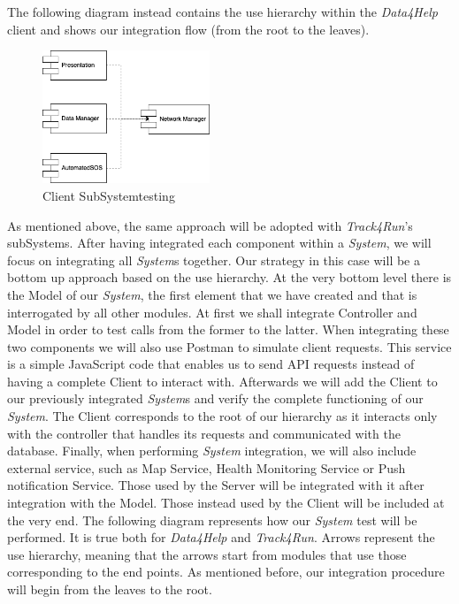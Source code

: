 \documentclass[titlepage]{article}
\begin{document}
\noindent
The following diagram instead contains the use hierarchy within the {\it Data4Help} client and shows our integration flow (from the root to the leaves).
\begin{figure}[H]
	\center
  	\includegraphics[width=5cm]{clientSubSystemTesting.png}
  	\caption{Client SubSystemtesting}
 	\label{fig:clientSubSystemTesting}
\end{figure} 
\noindent
As mentioned above, the same approach will be adopted with {\it Track4Run}’s subSystems.
\newline
\newline
After having integrated each component within a {\it System}, we will focus on integrating all {\it System}s together. Our strategy in this case will be a bottom up approach based on the use hierarchy. At the very bottom level there is the Model of our {\it System}, the first element that we have created and that is interrogated by all other modules. At first we shall integrate Controller and Model in order to test calls from the former to the latter. When integrating these two components we will also use Postman to simulate client requests. This service is a simple JavaScript code that enables us to send API requests instead of having a complete Client to interact with. 
Afterwards we will add the Client to our previously integrated {\it System}s and verify the complete functioning of our {\it System}. The Client corresponds to the root of our hierarchy as it interacts only with the controller that handles its requests and communicated with the database.
Finally, when performing {\it System} integration, we will also include external service, such as Map Service, Health Monitoring Service or Push notification Service. Those used by the Server will be integrated with it after integration with the Model. Those instead used by the Client will be included at the very end.
\newline
\newline
The following diagram represents how our {\it System} test will be performed. It is true both for {\it Data4Help} and {\it Track4Run}. Arrows represent the use hierarchy, meaning that the arrows start from modules that use those corresponding to the end points. As mentioned before, our integration procedure will begin from the leaves to the root.
\end{document}
